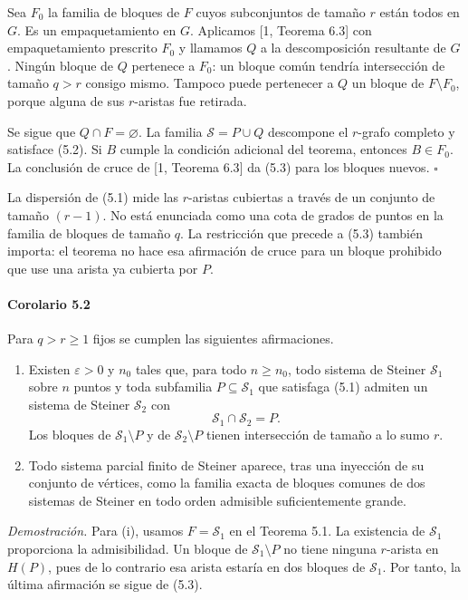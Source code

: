 \documentclass[spanish,11pt,a4paper]{article}
\begin{document}
Sea \(F_0\) la familia de bloques de \(F\) cuyos subconjuntos de tamaño \(r\) están todos en \(G\). Es un empaquetamiento en \(G\). Aplicamos {[}1, Teorema 6.3{]} con empaquetamiento prescrito \(F_0\) y llamamos \(Q\) a la descomposición resultante de \(G\). Ningún bloque de \(Q\) pertenece a \(F_0\): un bloque común tendría intersección de tamaño \(q>r\) consigo mismo. Tampoco puede pertenecer a \(Q\) un bloque de \(F\setminus F_0\), porque alguna de sus \(r\)-aristas fue retirada.

Se sigue que \(Q\cap F=\varnothing\). La familia \(\mathcal S=P\cup Q\) descompone el \(r\)-grafo completo y satisface (5.2). Si \(B\) cumple la condición adicional del teorema, entonces \(B\in F_0\). La conclusión de cruce de {[}1, Teorema 6.3{]} da (5.3) para los bloques nuevos. \(\square\)

La dispersión de (5.1) mide las \(r\)-aristas cubiertas a través de un conjunto de tamaño \((r-1)\). No está enunciada como una cota de grados de puntos en la familia de bloques de tamaño \(q\). La restricción que precede a (5.3) también importa: el teorema no hace esa afirmación de cruce para un bloque prohibido que use una arista ya cubierta por \(P\).

\par
\begin{samepage}
\paragraph{Corolario 5.2}\label{corolario-5.2}

Para \(q>r\ge1\) fijos se cumplen las siguientes afirmaciones.

\begin{enumerate}
\def\labelenumi{(\roman{enumi})}
\item
  Existen \(\varepsilon>0\) y \(n_0\) tales que, para todo \(n\ge n_0\), todo sistema de Steiner \(\mathcal S_1\) sobre \(n\) puntos y toda subfamilia \(P\subseteq\mathcal S_1\) que satisfaga (5.1) admiten un sistema de Steiner \(\mathcal S_2\) con \[\mathcal S_1\cap\mathcal S_2=P.
  \tag{5.4}\] Los bloques de \(\mathcal S_1\setminus P\) y de \(\mathcal S_2\setminus P\) tienen intersección de tamaño a lo sumo \(r\).
\item
  Todo sistema parcial finito de Steiner aparece, tras una inyección de su conjunto de vértices, como la familia exacta de bloques comunes de dos sistemas de Steiner en todo orden admisible suficientemente grande.
\end{enumerate}

\end{samepage}
\emph{Demostración.} Para (i), usamos \(F=\mathcal S_1\) en el Teorema 5.1. La existencia de \(\mathcal S_1\) proporciona la admisibilidad. Un bloque de \(\mathcal S_1\setminus P\) no tiene ninguna \(r\)-arista en \(H(P)\), pues de lo contrario esa arista estaría en dos bloques de \(\mathcal S_1\). Por tanto, la última afirmación se sigue de (5.3).
\end{document}
